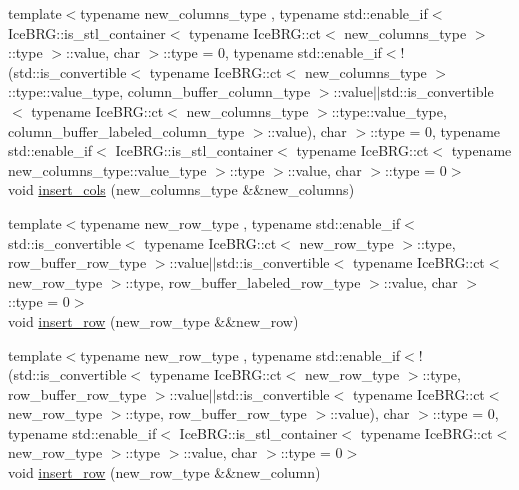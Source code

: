 \begin{DoxyCompactItemize}
\item 
{\footnotesize template$<$typename new\+\_\+columns\+\_\+type , typename std\+::enable\+\_\+if$<$ Ice\+B\+R\+G\+::is\+\_\+stl\+\_\+container$<$ typename Ice\+B\+R\+G\+::ct$<$ new\+\_\+columns\+\_\+type $>$\+::type $>$\+::value, char $>$\+::type  = 0, typename std\+::enable\+\_\+if$<$!(std\+::is\+\_\+convertible$<$ typename Ice\+B\+R\+G\+::ct$<$ new\+\_\+columns\+\_\+type $>$\+::type\+::value\+\_\+type, column\+\_\+buffer\+\_\+column\+\_\+type $>$\+::value$\vert$$\vert$std\+::is\+\_\+convertible$<$ typename Ice\+B\+R\+G\+::ct$<$ new\+\_\+columns\+\_\+type $>$\+::type\+::value\+\_\+type, column\+\_\+buffer\+\_\+labeled\+\_\+column\+\_\+type $>$\+::value), char $>$\+::type  = 0, typename std\+::enable\+\_\+if$<$ Ice\+B\+R\+G\+::is\+\_\+stl\+\_\+container$<$ typename Ice\+B\+R\+G\+::ct$<$ typename new\+\_\+columns\+\_\+type\+::value\+\_\+type $>$\+::type $>$\+::value, char $>$\+::type  = 0$>$ }\\void \hyperlink{classIceBRG_1_1labeled__array_a0a2ca02ed9a253b7ae55c585302ccbc7}{insert\+\_\+cols} (new\+\_\+columns\+\_\+type \&\&new\+\_\+columns)
\item 
{\footnotesize template$<$typename new\+\_\+row\+\_\+type , typename std\+::enable\+\_\+if$<$ std\+::is\+\_\+convertible$<$ typename Ice\+B\+R\+G\+::ct$<$ new\+\_\+row\+\_\+type $>$\+::type, row\+\_\+buffer\+\_\+row\+\_\+type $>$\+::value$\vert$$\vert$std\+::is\+\_\+convertible$<$ typename Ice\+B\+R\+G\+::ct$<$ new\+\_\+row\+\_\+type $>$\+::type, row\+\_\+buffer\+\_\+labeled\+\_\+row\+\_\+type $>$\+::value, char $>$\+::type  = 0$>$ }\\void \hyperlink{classIceBRG_1_1labeled__array_a95ca96a982630ea7be7849f66079fe68}{insert\+\_\+row} (new\+\_\+row\+\_\+type \&\&new\+\_\+row)
\item 
{\footnotesize template$<$typename new\+\_\+row\+\_\+type , typename std\+::enable\+\_\+if$<$!(std\+::is\+\_\+convertible$<$ typename Ice\+B\+R\+G\+::ct$<$ new\+\_\+row\+\_\+type $>$\+::type, row\+\_\+buffer\+\_\+row\+\_\+type $>$\+::value$\vert$$\vert$std\+::is\+\_\+convertible$<$ typename Ice\+B\+R\+G\+::ct$<$ new\+\_\+row\+\_\+type $>$\+::type, row\+\_\+buffer\+\_\+row\+\_\+type $>$\+::value), char $>$\+::type  = 0, typename std\+::enable\+\_\+if$<$ Ice\+B\+R\+G\+::is\+\_\+stl\+\_\+container$<$ typename Ice\+B\+R\+G\+::ct$<$ new\+\_\+row\+\_\+type $>$\+::type $>$\+::value, char $>$\+::type  = 0$>$ }\\void \hyperlink{classIceBRG_1_1labeled__array_a7d84396e552a244eef839d1b09bfa4ba}{insert\+\_\+row} (new\+\_\+row\+\_\+type \&\&new\+\_\+column)

\end{DoxyCompactItemize}
